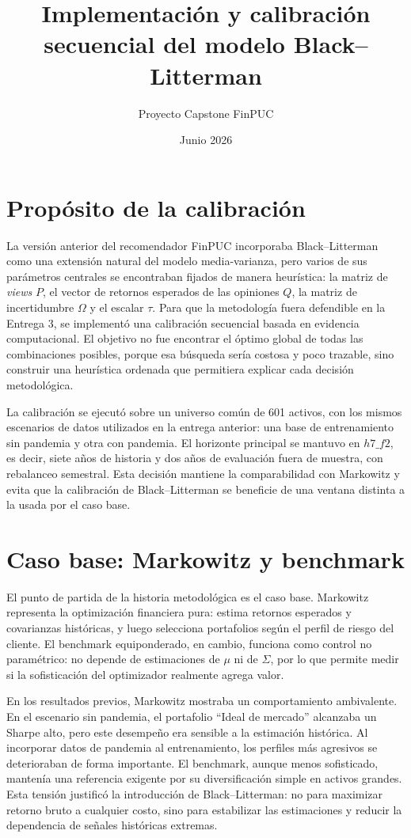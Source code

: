 \documentclass[11pt]{article}
\title{Implementaci\'on y calibraci\'on secuencial del modelo Black--Litterman}
\author{Proyecto Capstone FinPUC}
\date{Junio 2026}
\begin{document}
\maketitle

\section{Prop\'osito de la calibraci\'on}

La versi\'on anterior del recomendador FinPUC incorporaba Black--Litterman como una extensi\'on natural del modelo media-varianza, pero varios de sus par\'ametros centrales se encontraban fijados de manera heur\'istica: la matriz de \textit{views} $P$, el vector de retornos esperados de las opiniones $Q$, la matriz de incertidumbre $\Omega$ y el escalar $\tau$. Para que la metodolog\'ia fuera defendible en la Entrega 3, se implement\'o una calibraci\'on secuencial basada en evidencia computacional. El objetivo no fue encontrar el \'optimo global de todas las combinaciones posibles, porque esa b\'usqueda ser\'ia costosa y poco trazable, sino construir una heur\'istica ordenada que permitiera explicar cada decisi\'on metodol\'ogica.

La calibraci\'on se ejecut\'o sobre un universo com\'un de 601 activos, con los mismos escenarios de datos utilizados en la entrega anterior: una base de entrenamiento sin pandemia y otra con pandemia. El horizonte principal se mantuvo en $h7\_f2$, es decir, siete a\~nos de historia y dos a\~nos de evaluaci\'on fuera de muestra, con rebalanceo semestral. Esta decisi\'on mantiene la comparabilidad con Markowitz y evita que la calibraci\'on de Black--Litterman se beneficie de una ventana distinta a la usada por el caso base.

\section{Caso base: Markowitz y benchmark}

El punto de partida de la historia metodol\'ogica es el caso base. Markowitz representa la optimizaci\'on financiera pura: estima retornos esperados y covarianzas hist\'oricas, y luego selecciona portafolios seg\'un el perfil de riesgo del cliente. El benchmark equiponderado, en cambio, funciona como control no param\'etrico: no depende de estimaciones de $\mu$ ni de $\Sigma$, por lo que permite medir si la sofisticaci\'on del optimizador realmente agrega valor.

En los resultados previos, Markowitz mostraba un comportamiento ambivalente. En el escenario sin pandemia, el portafolio ``Ideal de mercado'' alcanzaba un Sharpe alto, pero este desempe\~no era sensible a la estimaci\'on hist\'orica. Al incorporar datos de pandemia al entrenamiento, los perfiles m\'as agresivos se deterioraban de forma importante. El benchmark, aunque menos sofisticado, manten\'ia una referencia exigente por su diversificaci\'on simple en activos grandes. Esta tensi\'on justific\'o la introducci\'on de Black--Litterman: no para maximizar retorno bruto a cualquier costo, sino para estabilizar las estimaciones y reducir la dependencia de se\~nales hist\'oricas extremas.
\end{document}
